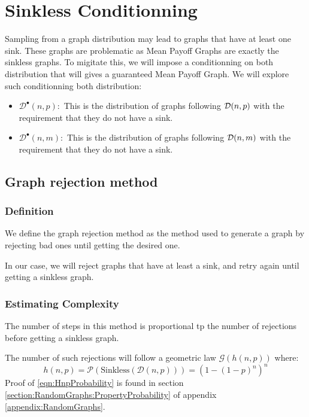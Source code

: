 \section{Sinkless Conditionning}
Sampling from a graph distribution may lead to graphs that have at least one sink. 
\newline These graphs are problematic as Mean Payoff Graphs are exactly the sinkless graphs.
\newline To migitate this, we will impose a conditionning on both distribution that will gives a guaranteed Mean Payoff Graph.
\newline We will explore such conditionning both distribution:
\begin{itemize}
	\item $\mathcal{D}^\bullet(n,p):$ This is the distribution of graphs following $\mathcal{D}(n,p)$ with the requirement that they do not have a sink.
	\item $\mathcal{D}^\bullet(n,m):$ This is the distribution of graphs following $\mathcal{D}(n,m)$ with the requirement that they do not have a sink.
\end{itemize}
\subsection{Graph rejection method}
\subsubsection{Definition}
We define the graph rejection method as the method used to generate a graph by rejecting bad ones until getting the desired one.

In our case, we will reject graphs that have at least a sink, and retry again until getting a sinkless graph.

\subsubsection{Estimating Complexity}
The number of steps in this method is proportional tp the number of rejections before getting a sinkless graph.

The number of such rejections will follow a geometric law $\mathcal{G}(h(n,p))$ where: 
\begin{equation}
	\label{eqn:HnpProbability}
	h(n,p)=\mathscr{P}\left(\text{Sinkless}(\mathcal{D}(n,p))\right)=(1-(1-p)^n)^n
\end{equation}
Proof of \eqref{eqn:HnpProbability} is found in section \ref{section:RandomGraphs:PropertyProbability} of appendix \ref{appendix:RandomGraphs}.

